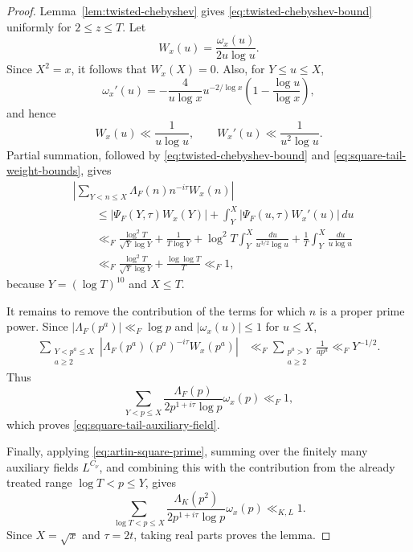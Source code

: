 \documentclass[twoside,reqno,11pt,a4paper]{amsart}
\numberwithin{equation}{section}
\theoremstyle{plain}
\theoremstyle{definition}
\theoremstyle{remark}
\renewcommand{\le}{\leqslant}
\renewcommand{\ge}{\geqslant}
\begin{document}
\begin{proof}
Lemma~\ref{lem:twisted-chebyshev} gives
\eqref{eq:twisted-chebyshev-bound} uniformly for $2\le z\le T$.
Let
\begin{equation*}
        W_x(u)=\frac{\omega_x(u)}{2u\log u}.
\end{equation*}
Since $X^2=x$, it follows that $W_x(X)=0$.  Also, for $Y\le u\le X$,
\begin{equation*}
        \omega_x'(u)
        =
        -\frac4{u\log x}
        u^{-2/\log x}
        \left(1-\frac{\log u}{\log x}\right),
\end{equation*}
and hence
\begin{equation}\label{eq:square-tail-weight-bounds}
        W_x(u)\ll\frac1{u\log u},
        \qquad
        W_x'(u)\ll\frac1{u^2\log u}.
\end{equation}
Partial summation, followed by
\eqref{eq:twisted-chebyshev-bound} and
\eqref{eq:square-tail-weight-bounds}, gives
\begin{align*}
&\left|
\sum_{Y<n\le X}\Lambda_F(n)n^{-i\tau}W_x(n)
\right| \\
&\qquad\le
|\Psi_F(Y,\tau)W_x(Y)|
+\int_Y^X|\Psi_F(u,\tau)W_x'(u)|\,du \\
&\qquad\ll_F
\frac{\log^2T}{\sqrt Y\log Y}
+\frac1{T\log Y}
+\log^2T\int_Y^X\frac{\,du}{u^{3/2}\log u}
+\frac1T\int_Y^X\frac{\,du}{u\log u} \\
&\qquad\ll_F
\frac{\log^2T}{\sqrt Y\log Y}
+\frac{\log\log T}{T}
\ll_F1,
\end{align*}
because $Y=(\log T)^{10}$ and $X\le T$.

It remains to remove the contribution of the terms for which $n$ is a proper prime power.  Since
$|\Lambda_F(p^a)|\ll_F\log p$ and $|\omega_x(u)|\le1$ for $u\le X$,
\begin{align*}
\sum_{\substack{Y<p^a\le X\\a\ge2}}
\left|
\Lambda_F(p^a)(p^a)^{-i\tau}W_x(p^a)
\right|
&\ll_F
\sum_{\substack{p^a>Y\\a\ge2}}
\frac1{a p^a}\ll_FY^{-1/2}.
\end{align*}
Thus
\begin{equation*}
        \sum_{Y<p\le X}
        \frac{\Lambda_F(p)}{2p^{1+i\tau}\log p}\omega_x(p)
        \ll_F1,
\end{equation*}
which proves \eqref{eq:square-tail-auxiliary-field}.

Finally, applying \eqref{eq:artin-square-prime}, summing over the finitely many
auxiliary fields $L^{C_\nu}$, and combining this with the contribution from the already treated
range $\log T<p\le Y$, gives
\begin{equation*}
        \sum_{\log T<p\le X}
        \frac{\Lambda_K(p^2)}{2p^{1+i\tau}\log p}\omega_x(p)
        \ll_{K,L}1.
\end{equation*}
Since $X=\sqrt x$ and $\tau=2t$, taking real parts proves the lemma.
\end{proof}
\end{document}
